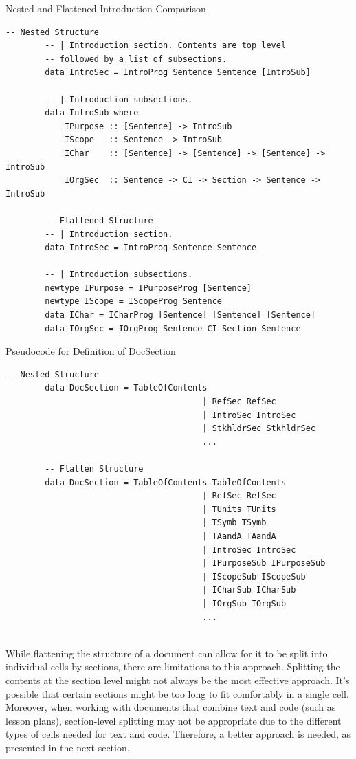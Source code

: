 \begin{listing}[h]
	\caption{Nested and Flattened Introduction Comparison}
	\label{code:IntroSec}
	\begin{lstlisting}[language=haskell1]
		-- Nested Structure
		-- | Introduction section. Contents are top level 
		-- followed by a list of subsections.
		data IntroSec = IntroProg Sentence Sentence [IntroSub]
		
		-- | Introduction subsections.
		data IntroSub where
			IPurpose :: [Sentence] -> IntroSub
			IScope   :: Sentence -> IntroSub
			IChar    :: [Sentence] -> [Sentence] -> [Sentence] -> IntroSub
			IOrgSec  :: Sentence -> CI -> Section -> Sentence -> IntroSub
	
		-- Flattened Structure
		-- | Introduction section.
		data IntroSec = IntroProg Sentence Sentence
	
		-- | Introduction subsections.
		newtype IPurpose = IPurposeProg [Sentence] 
		newtype IScope = IScopeProg Sentence 
		data IChar = ICharProg [Sentence] [Sentence] [Sentence]
		data IOrgSec = IOrgProg Sentence CI Section Sentence
	\end{lstlisting}
\end{listing}

\begin{listing}[h]
	\caption{Pseudocode for Definition of DocSection}
	\label{code:DocSection}
	\begin{lstlisting}[language=haskell1]
		-- Nested Structure
		data DocSection = TableOfContents
										| RefSec RefSec
										| IntroSec IntroSec
										| StkhldrSec StkhldrSec
										...
		
		-- Flatten Structure
		data DocSection = TableOfContents TableOfContents
										| RefSec RefSec
										| TUnits TUnits
										| TSymb TSymb
										| TAandA TAandA
										| IntroSec IntroSec
										| IPurposeSub IPurposeSub
										| IScopeSub IScopeSub
										| ICharSub ICharSub
										| IOrgSub IOrgSub
										...
		
	\end{lstlisting}
\end{listing}
 
While flattening the structure of a document can allow for it to be split into 
individual cells by sections, there are limitations to this approach. Splitting 
the contents at the section level might not always be the most effective 
approach. It's possible that certain sections might be too long to fit 
comfortably in a single cell. Moreover, when working with documents that 
combine text and code (such as lesson plans), section-level splitting may not 
be appropriate due to the different types of cells needed for text and code. 
Therefore, a better approach is needed, as presented in the next section.

